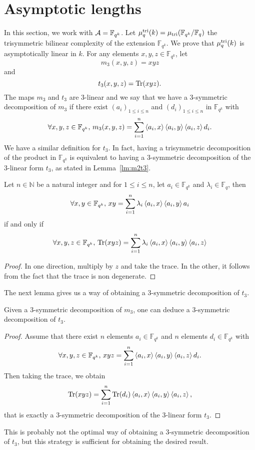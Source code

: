 \documentclass[11pt]{article}
\begin{document}
\section{Asymptotic lengths}
\label{sec:asymptotic}
In this section, we work with $\mathcal{A}=\mathbb{F}_{q^k}$. Let
$\mu_{q}^{\text{tri}}(k)=\mu_{\text{tri}}(\mathbb{F}_{q^k}/\mathbb{F}_q)$ the trisymmetric
bilinear complexity of the extension $\mathbb{F}_{q^k}$. We prove that
$\mu_{q}^{\text{tri}}(k)$ is asymptotically linear in $k$. For any elements $x, y, z\in\mathbb{F}_{q^k}$, let
\[
m_3(x, y, z) = xyz
\]
and
\[
t_3(x, y, z) = \operatorname{Tr}(xyz).
\]
The maps $m_3$ and $t_3$ are $3$-linear and we say that we have a $3$-symmetric
decomposition of $m_3$ if there exist $(a_i)_{1\leq i\leq n}$ and $(d_i)_{1\leq i\leq
n}$ in $\mathbb{F}_{q^k}$ with
\begin{equation}
    \forall x, y, z\in\mathbb{F}_{q^k},\,m_3(x, y, z) =
    \sum_{i=1}^n\left\langle a_i,x\right\rangle\left\langle a_i,y\right\rangle\left\langle a_i,z\right\rangle d_i.
  \label{eq:3-sym}
\end{equation}
We have a similar definition for $t_3$. In fact, having a trisymmetric
decomposition of the product in $\mathbb{F}_{q^k}$ is equivalent to having a
$3$-symmetric decomposition of the $3$-linear form $t_3$, as stated in Lemma~\ref{lm:m2t3}.
\begin{lm}
  \label{lm:m2t3}
  Let $n\in\mathbb{N}$ be a natural integer and for $1\leq i \leq n$, let
  $a_i\in\mathbb{F}_{q^k}$ and $\lambda_i\in\mathbb{F}_q$, then
  \[
    \forall x, y\in\mathbb{F}_{q^k},\, xy =
    \sum_{i=1}^n\lambda_i\left\langle a_i,x\right\rangle\left\langle a_i,y\right\rangle a_i
  \]
  if and only if
  \[
    \forall x, y, z\in\mathbb{F}_{q^k},\,\operatorname{Tr}(xyz) =
    \sum_{i=1}^n\lambda_i\left\langle a_i,x\right\rangle\left\langle a_i,y\right\rangle\left\langle a_i,z\right\rangle
  \]
\end{lm}
\begin{proof}
  In one direction, multiply by $z$ and take the trace. In the other, it follows
  from the fact that the trace is non degenerate.
\end{proof}
The next lemma gives us a way of obtaining a $3$-symmetric decomposition of
$t_3$.
\begin{lm}
  Given a $3$-symmetric decomposition of $m_3$, one can deduce a $3$-symmetric
  decomposition of $t_3$.
\end{lm}
\begin{proof}
  Assume that there exist $n$ elements $a_i\in\mathbb{F}_{q^k}$ and $n$ elements
  $d_i\in\mathbb{F}_{q^k}$ with
  \[
    \forall x, y, z\in\mathbb{F}_{q^k},\,xyz =
    \sum_{i=1}^n\left\langle a_i,x\right\rangle\left\langle a_i,y\right\rangle\left\langle a_i,z\right\rangle d_i.
  \]
  Then taking the trace, we obtain
  \[
    \operatorname{Tr}(xyz) = \sum_{i=1}^n\operatorname{Tr}(d_i)\left\langle a_i,x\right\rangle\left\langle a_i,y\right\rangle\left\langle a_i,z\right\rangle,
  \]
  that is exactly a $3$-symmetric decomposition of the $3$-linear form $t_3$.
\end{proof}
\begin{rem}
  This is probably not the optimal way of obtaining a
  $3$-symmetric decomposition of $t_3$, but this strategy is sufficient for
  obtaining the desired result.
\end{rem}
\end{document}
